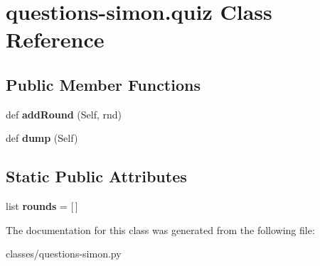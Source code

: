 \hypertarget{classquestions-simon_1_1quiz}{}\section{questions-\/simon.quiz Class Reference}
\label{classquestions-simon_1_1quiz}
\subsection*{Public Member Functions}
\begin{DoxyCompactItemize}
\item 
\mbox{\label{classquestions-simon_1_1quiz_a36a2cfa78434336af8dec943bc8d4b1b}} 
def {\bfseries add\+Round} (Self, rnd)
\item 
\mbox{\label{classquestions-simon_1_1quiz_a6af12da1b218f3a7f6d43126fe2f94e3}} 
def {\bfseries dump} (Self)
\end{DoxyCompactItemize}
\subsection*{Static Public Attributes}
\begin{DoxyCompactItemize}
\item 
\mbox{\label{classquestions-simon_1_1quiz_a2b862c6463d392925b4f6b1f1d5e5ba6}} 
list {\bfseries rounds} = \mbox{[}$\,$\mbox{]}
\end{DoxyCompactItemize}


The documentation for this class was generated from the following file\+:\begin{DoxyCompactItemize}
\item 
classes/questions-\/simon.\+py\end{DoxyCompactItemize}
